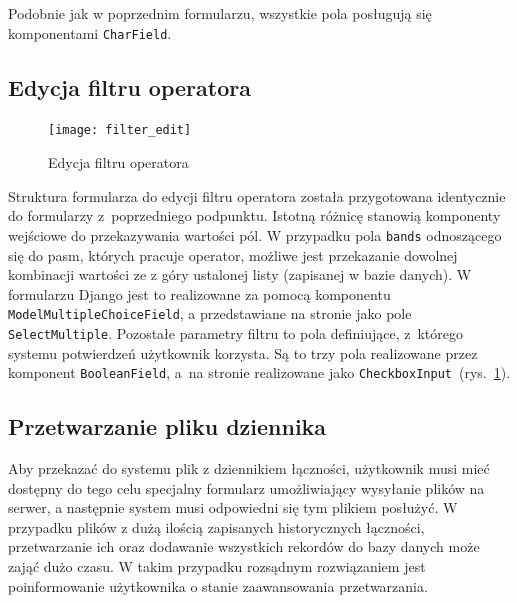 \documentclass[]{mgr}
\begin{document}
                Podobnie jak w poprzednim formularzu, wszystkie pola posługują się komponentami \texttt{CharField}.

            \subsection{Edycja filtru operatora}
            \begin{figure}
                \vspace{-30pt}
                \begin{center}
                    \texttt{[image: filter\_edit]}
                \end{center}
                \vspace{-20pt}
                \caption{Edycja filtru operatora}
                \vspace{-30pt}
                \label{fig:filter_edit}
            \end{figure}
            Struktura formularza do edycji filtru operatora została przygotowana identycznie do formularzy z~poprzedniego podpunktu. Istotną różnicę stanowią komponenty wejściowe do przekazywania wartości pól. W przypadku pola \texttt{bands} odnoszącego się do pasm, których pracuje operator, możliwe jest przekazanie dowolnej kombinacji wartości ze z góry ustalonej listy (zapisanej w bazie danych). W formularzu Django jest to realizowane za pomocą komponentu \texttt{ModelMultipleChoiceField}, a przedstawiane na stronie jako pole \texttt{SelectMultiple}. Pozostałe parametry filtru to pola definiujące, z~którego systemu potwierdzeń użytkownik korzysta. Są to trzy pola realizowane przez komponent \texttt{BooleanField}, a~na stronie realizowane jako \texttt{CheckboxInput}~(rys.~\ref{fig:filter_edit}).

            \subsection{Przetwarzanie pliku dziennika}
            Aby przekazać do systemu plik z dziennikiem łączności, użytkownik musi mieć dostępny do tego celu specjalny formularz umożliwiający wysyłanie plików na serwer, a następnie system musi odpowiedni się tym plikiem posłużyć. W przypadku plików z dużą ilością zapisanych historycznych łączności, przetwarzanie ich oraz dodawanie wszystkich rekordów do bazy danych może zająć dużo czasu. W takim przypadku rozsądnym rozwiązaniem jest poinformowanie użytkownika o stanie zaawansowania przetwarzania.
\end{document}
